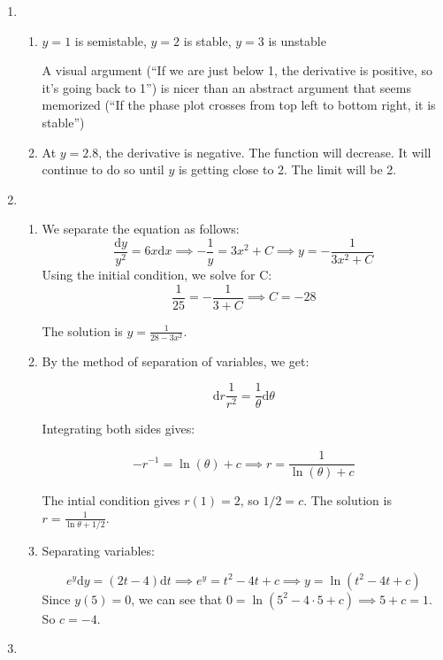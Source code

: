 \begin{enumerate}
\item 
\begin{enumerate}
    \item 
    $y=1$ is semistable,
    $y=2$ is stable,
    $y=3$ is unstable
    
    A visual argument (``If we are just below 1, the derivative is positive, so it's going back to 1'') is nicer than an abstract argument that seems memorized (``If the phase plot crosses from top left to bottom right, it is stable'')

    \item 
    At $y=2.8$, the derivative is negative. The function will decrease. It will continue to do so until $y$ is getting close to 2. The limit will be 2.
\end{enumerate}

\item 
\begin{enumerate}
    \item We separate the equation as follows:
    \[
    \frac{\mathrm{d}y}{y^2} = 6x\mathrm{d}x \implies -\frac{1}{y} = 3x^2+C \implies y=-\frac{1}{3x^2+C}
    \]
    Using the initial condition, we solve for C:
    \[
    \frac{1}{25} = -\frac{1}{3+C} \implies C = -28
    \]

    The solution is $y = \frac{1}{28-3x^2}$.

    \item By the method of separation of variables, we get:

    \[\mathrm d r \frac{1}{r^2} = \frac{1}{\theta}\mathrm d \theta \]

    Integrating both sides gives:

    \[-r^{-1} = \ln(\theta) +c \implies r = \frac{1}{\ln(\theta)+c}\]

    The intial condition gives $r(1) = 2$, so $1/2 = c$. The solution is $r = \frac{1}{\ln \theta + 1/2}$.

    \item Separating variables: 

    \[e^y \mathrm d y = (2t-4)\mathrm d t \implies e^y = t^2 -4t+c \implies y = \ln(t^2-4t+c)\]
    Since $y(5) = 0$, we can see that $0 = \ln(5^2-4\cdot 5+c) \implies 5+c=1$. So $c=-4$. 

    
    

\end{enumerate}

\item 


\end{enumerate}
